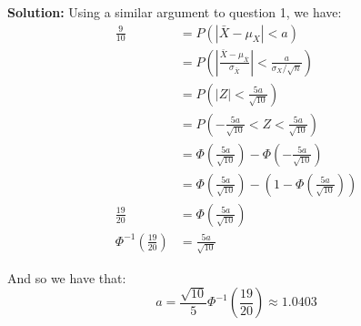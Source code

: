 \documentclass{article}
\begin{document}
\noindent\textbf{Solution:} Using a similar argument to question 1, we have:
\begin{align*}
  \frac{9}{10}&=P(|\bar{X}-\mu_X|<a)\\
  &=P\left(\left|\frac{\bar{X}-\mu_{\bar{X}}}{\sigma_{\bar{X}}}\right|<\frac{a}{\sigma_X/\sqrt{n}}\right)\tag{see Q1}\\
  &=P\left(\left|Z\right|<\frac{5a}{\sqrt{10}}\right)\tag{standard normal RV}\\
  &=P\left(-\frac{5a}{\sqrt{10}}<Z<\frac{5a}{\sqrt{10}}\right)\\
  &=\Phi\left(\frac{5a}{\sqrt{10}}\right)-\Phi\left(-\frac{5a}{\sqrt{10}}\right)\tag{cdf of standard normal RV}\\
  &=\Phi\left(\frac{5a}{\sqrt{10}}\right)-\left(1-\Phi\left(\frac{5a}{\sqrt{10}}\right)\tag{$1-\Phi(z)=\Phi(-z)$}\right)\\
  \frac{19}{20}&=\Phi\left(\frac{5a}{\sqrt{10}}\right)\\
  \Phi^{-1}\left(\frac{19}{20}\right)&=\frac{5a}{\sqrt{10}}
\end{align*}

And so we have that:
$$a=\frac{\sqrt{10}}{5}\Phi^{-1}\left(\frac{19}{20}\right)\approx\boxed{1.0403}$$
\end{document}
